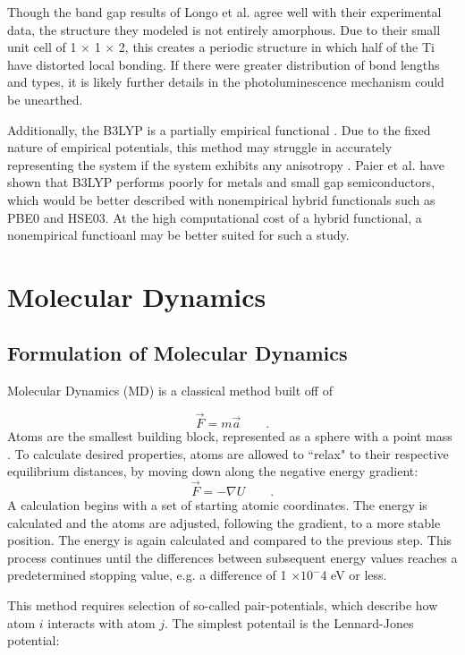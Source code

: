 \documentclass[3p,review,12pt]{elsarticle}
\begin{document}
\par

Though the band gap results of Longo et al. agree well with their experimental data, the structure they modeled is not entirely amorphous. Due to their small unit cell of 1 $\times$ 1 $\times$ 2, this creates a periodic structure in which half of the Ti have distorted local bonding. If there were greater distribution of bond lengths and types, it is likely further details in the photoluminescence mechanism could be unearthed.
\par

Additionally, the B3LYP is a partially empirical functional \cite{Paier2007}. Due to the fixed nature of empirical potentials, this method may struggle in accurately representing the system if the system exhibits any anisotropy \cite{Hohl1991}. Paier et al. \cite{Paier2007} have shown that B3LYP performs poorly for metals and small gap semiconductors, which would be better described with nonempirical hybrid functionals such as PBE0 and HSE03. At the high computational cost of a hybrid functional, a nonempirical functioanl may be better suited for such a study.


\section{Molecular Dynamics}
\subsection{Formulation of Molecular Dynamics}
Molecular Dynamics (MD) is a classical method built off of

\begin{equation}
\vec{F}=m\vec{a} \qquad .
\end{equation}
Atoms are the smallest building block, represented as a sphere with a point mass \cite{Lee2012}. To calculate desired properties, atoms are allowed to ``relax" to their respective equilibrium distances, by moving down along the negative energy gradient:
\begin{equation}
\vec{F} = - \nabla U \qquad .
\end{equation}
A calculation begins with a set of starting atomic coordinates. The energy is calculated and the atoms are adjusted, following the gradient, to a more stable position. The energy is again calculated and compared to the previous step. This process continues until the differences between subsequent energy values reaches a predetermined stopping value, e.g. a difference of 1 $\times 10^-4$ eV or less.
\par
This method requires selection of so-called pair-potentials, which describe how atom $i$ interacts with atom $j$. The simplest potentail is the Lennard-Jones potential:
\end{document}
